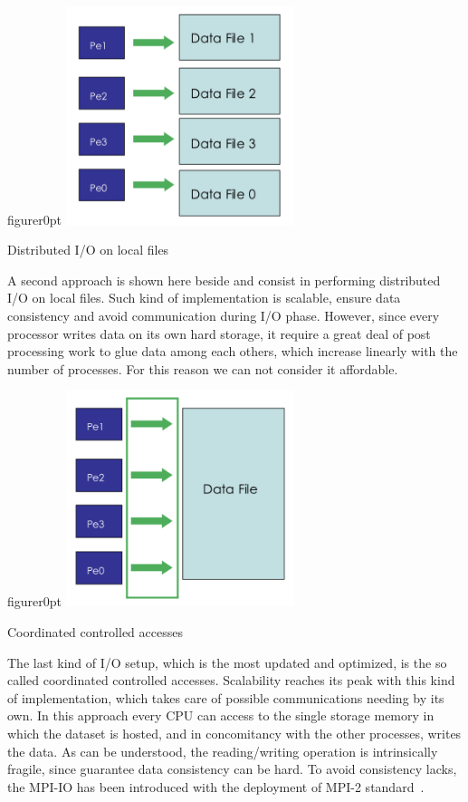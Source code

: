 \begin{wrapfloat}{figure}{r}{0pt}
\includegraphics[width=0.5\textwidth]{grafici/localio}
\caption{Distributed I/O on local files}
\end{wrapfloat}
\par
A second approach is shown here beside and consist in performing distributed I/O on local files. Such kind of implementation is scalable, ensure data consistency and avoid communication during I/O phase. However, since every processor writes data on its own hard storage, it require a great deal of post processing work to glue data among each others, which increase linearly with the number of processes. For this reason we can not consider it affordable. \\

\begin{wrapfloat}{figure}{r}{0pt}
\includegraphics[width=0.5\textwidth]{grafici/mpiio}
\caption{Coordinated controlled accesses}
\end{wrapfloat}
\par
The last kind of I/O setup, which is the most updated and optimized, is the so called coordinated controlled accesses.
Scalability reaches its peak with this kind of implementation, which takes care of possible communications needing by its own.
In this approach every CPU can access to the single storage memory in which the dataset is hosted, and in concomitancy with the other processes, writes the data. As can be understood, the reading/writing operation is intrinsically fragile, since guarantee data consistency can be hard. To avoid consistency lacks, the MPI-IO has been introduced with the deployment of MPI-2 standard~\cite{MPI:standard2}.

